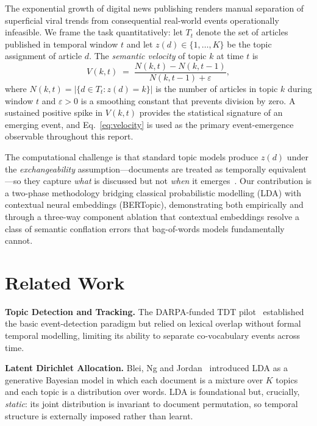 \documentclass[10pt,twocolumn,a4paper]{article}
\begin{document}
The exponential growth of digital news publishing renders manual separation of superficial viral trends from consequential real-world events operationally infeasible. We frame the task quantitatively: let $T_t$ denote the set of articles published in temporal window $t$ and let $z(d) \in \{1,\dots,K\}$ be the topic assignment of article $d$. The \emph{semantic velocity} of topic $k$ at time $t$ is
\begin{equation}
\label{eq:velocity}
V(k, t) \;=\; \frac{N(k,t) - N(k,t{-}1)}{N(k,t{-}1) + \varepsilon},
\end{equation}
where $N(k,t) = |\{d \in T_t : z(d) = k\}|$ is the number of articles in topic $k$ during window $t$ and $\varepsilon > 0$ is a smoothing constant that prevents division by zero. A sustained positive spike in $V(k,t)$ provides the statistical signature of an emerging event, and Eq.~\eqref{eq:velocity} is used as the primary event-emergence observable throughout this report.

The computational challenge is that standard topic models produce $z(d)$ under the \emph{exchangeability} assumption---documents are treated as temporally equivalent---so they capture \emph{what} is discussed but not \emph{when} it emerges~\cite{allan1998,blei2003}. Our contribution is a two-phase methodology bridging classical probabilistic modelling (LDA) with contextual neural embeddings (BERTopic), demonstrating both empirically and through a three-way component ablation that contextual embeddings resolve a class of semantic conflation errors that bag-of-words models fundamentally cannot.

\section{Related Work}
\label{sec:related}

\textbf{Topic Detection and Tracking.} The DARPA-funded TDT pilot~\cite{allan1998} established the basic event-detection paradigm but relied on lexical overlap without formal temporal modelling, limiting its ability to separate co-vocabulary events across time.

\textbf{Latent Dirichlet Allocation.} Blei, Ng and Jordan~\cite{blei2003} introduced LDA as a generative Bayesian model in which each document is a mixture over $K$ topics and each topic is a distribution over words. LDA is foundational but, crucially, \emph{static}: its joint distribution is invariant to document permutation, so temporal structure is externally imposed rather than learnt.
\end{document}
